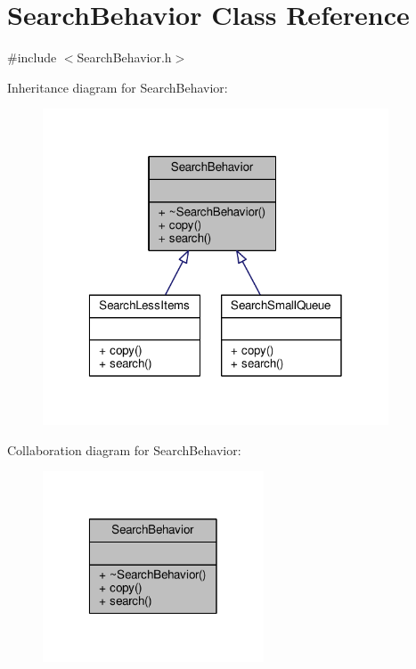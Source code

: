 \hypertarget{classSearchBehavior}{\section{Search\-Behavior Class Reference}
\label{classSearchBehavior}
}


{\ttfamily \#include $<$Search\-Behavior.\-h$>$}



Inheritance diagram for Search\-Behavior\-:\nopagebreak
\begin{figure}[H]
\begin{center}
\leavevmode
\includegraphics[width=291pt]{classSearchBehavior__inherit__graph}
\end{center}
\end{figure}


Collaboration diagram for Search\-Behavior\-:\nopagebreak
\begin{figure}[H]
\begin{center}
\leavevmode
\includegraphics[width=186pt]{classSearchBehavior__coll__graph}
\end{center}
\end{figure}
